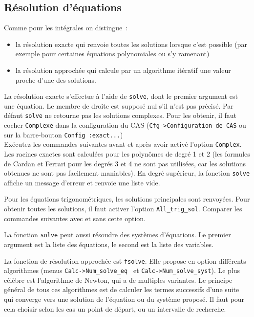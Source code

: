 \documentclass{article}
\begin{document}
\begin{giacjshere}
\subsection{R\'esolution d'\'equations}
%
Comme pour les int\'egrales on distingue~:
\begin{itemize}
\item
la r\'esolution exacte qui renvoie toutes les solutions 
lorsque c'est possible (par exemple pour certaines \'equations polynomiales
ou s'y ramenant)
\item
la r\'esolution approch\'ee qui calcule par un algorithme it\'eratif
une valeur proche d'une des solutions.
\end{itemize}
La r\'esolution exacte s'effectue \`a l'aide de \verb|solve|, dont le
premier argument est une \'equation. Le membre de droite est
suppos\'e nul s'il n'est pas pr\'ecis\'e. Par 
d\'efaut \verb|solve| ne retourne pas les solutions complexes. 
Pour les obtenir, il faut cocher \verb|Complexe| dans la configuration du CAS
({\tt Cfg->Configuration de CAS} ou sur la barre-bouton 
{\tt Config :exact...})\\ 
Ex\'ecutez les commandes suivantes
avant et apr\`es avoir activ\'e l'option \verb|Complex|. 
Les racines exactes sont calcul\'ees pour les polyn\^omes de
degr\'e 1 et 2 (les formules de Cardan et Ferrari pour les degr\'es
3 et 4 ne sont pas utilis\'ees, car les solutions obtenues
ne sont pas facilement maniables). En degr\'e sup\'erieur,
la fonction \verb|solve| affiche un message d'erreur et renvoie
une liste vide.

Pour les \'equations trigonom\'etriques, les solutions principales
sont renvoy\'ees. Pour obtenir toutes les solutions, il faut activer
l'option \verb|All_trig_sol|. Comparer les commandes suivantes avec et
sans cette option.

La fonction \verb|solve| peut aussi r\'esoudre des syst\`emes
d'\'equations. Le premier argument est la liste des \'equations, le
second est la liste des variables.

La fonction de r\'esolution approch\'ee est \verb|fsolve|. Elle
propose en option diff\'erents algorithmes
(menus \verb|Calc->Num_solve_eq | et \verb|Calc->Num_solve_syst|).
 Le plus c\'el\`ebre est
l'algori\-thme de Newton, qui a de multiples variantes. Le principe
g\'en\'eral de tous ces algorithmes est de calculer les termes
successifs d'une suite qui converge vers une solution de l'\'equation
ou du syst\`eme propos\'e. Il faut pour cela choisir selon les cas
un point de d\'epart, ou un intervalle de recherche.


\end{giacjshere}
\end{document}
